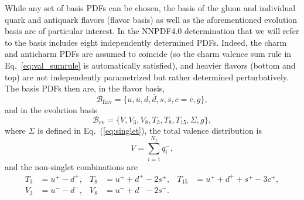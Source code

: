 \documentclass[11pt,a4paper]{article}
\begin{document}
While any set of basis PDFs can be chosen, the basis of the gluon and individual quark and antiquark flavors (flavor basis) as well as the aforementioned evolution basis are of particular interest. In the NNPDF4.0 determination that we will refer to the basis includes eight independently determined PDFs. Indeed, the charm and anticharm PDFs are assumed to coincide (so  the charm valence sum rule in Eq.~\eqref{eq:val_sumrule} is automatically satisfied), and heavier flavors (bottom and top) are not independently parametrized but rather determined perturbatively. 
The basis PDFs then are, in the flavor basis,
%
\begin{equation}\label{eq:bfldef}
\mathcal{B}_\text{flav}=\{u,\bar u,d,\bar d, s, \bar s, c=\bar c, g\},
\end{equation}
%
and in the evolution basis
%
\begin{equation}\label{eq:bevdef}
\mathcal{B}_\text{ev}=\{V,V_3, V_8,T_3,T_8,T_{15},\Sigma, g\},
\end{equation}
%
where $\Sigma$ is defined in Eq.~(\ref{eq:singlet}), the total valence distribution is
%
\begin{equation}\label{eq:valdef}
V=\sum_{i=1}^{N_f} q^-_i,
\end{equation}
%
and the non-singlet combinations are
%
\begin{align}
T_3&=u^+-d^+, & T_8&=u^++d^+-2 s^+, & T_{15}&=u^++d^+ +s^+-3c^+,\label{eq:tdef}\\
V_3&=u^--d^-, & V_8&=u^-+d^--2 s^-.\label{eq:vdef}
\end{align}



%
\end{document}
